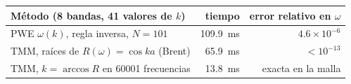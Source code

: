 \begin{tabular}{lrr}
\toprule
Método (8 bandas, 41 valores de $k$) & tiempo & error relativo en $\omega$ \\
\midrule
PWE $\omega(k)$, regla inversa, $N=101$ & 109.9~ms & $4.6\times10^{-6}$ \\
TMM, raíces de $R(\omega)=\cos ka$ (Brent) & 65.9~ms & $<10^{-13}$ \\
TMM, $k=\arccos R$ en 60001 frecuencias & 13.8~ms & exacta en la malla \\
\bottomrule
\end{tabular}
